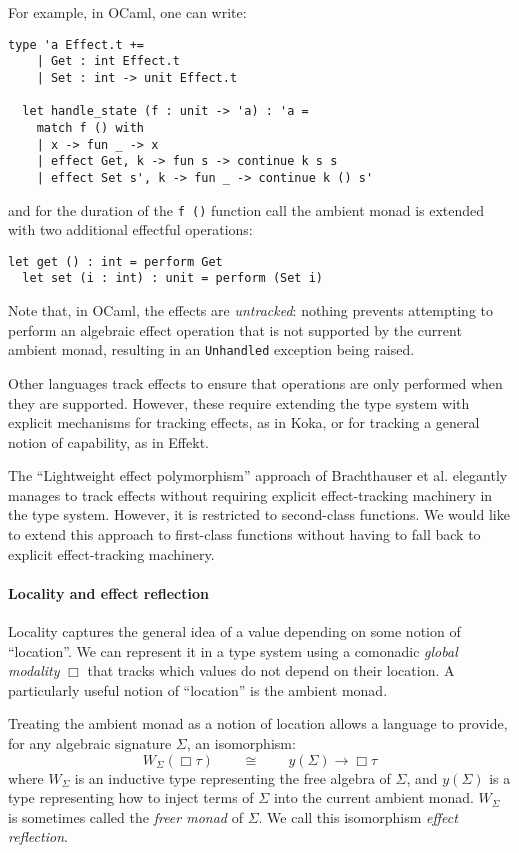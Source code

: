 \documentclass[acmsmall, screen, nonacm]{acmart}
\theoremstyle{definition}
\newcommand{\glob}{\mathop{\Box}}
\newcommand{\yoneda}[1]{y(#1)}
\newcommand{\ind}[1]{W_{#1}}
\begin{document}
For example, in OCaml, one can write:
\begin{lstlisting}[style=oxcaml]
  type 'a Effect.t +=
    | Get : int Effect.t
    | Set : int -> unit Effect.t

  let handle_state (f : unit -> 'a) : 'a =
    match f () with
    | x -> fun _ -> x
    | effect Get, k -> fun s -> continue k s s
    | effect Set s', k -> fun _ -> continue k () s'
\end{lstlisting}
and for the duration of the \lstinline[style=oxcaml]{f ()} function call
the ambient monad is extended with two additional effectful operations:
\begin{lstlisting}[style=oxcaml]
  let get () : int = perform Get
  let set (i : int) : unit = perform (Set i)
\end{lstlisting}

Note that, in OCaml, the effects are \emph{untracked}: nothing prevents
attempting to perform an algebraic effect operation that is not
supported by the current ambient monad, resulting in an
\lstinline[style=oxcaml]{Unhandled} exception being raised.

Other languages track effects to ensure that operations are only
performed when they are supported. However, these require extending the
type system with explicit mechanisms for tracking effects, as in
Koka\cite{leijen2017type}, or for tracking a general notion of
capability, as in Effekt\cite{brachthauser2022effects}.

The ``Lightweight effect polymorphism'' approach of Brachthauser et
al. elegantly manages to track effects without requiring explicit
effect-tracking machinery in the type system. However, it is restricted
to second-class functions. We would like to extend this approach to
first-class functions without having to fall back to explicit
effect-tracking machinery.

\paragraph{Locality and effect reflection}
Locality captures the general idea of a value depending on some notion
of ``location''. We can represent it in a type system using a comonadic
\emph{global modality} $\glob$ that tracks which values do not depend on
their location. A particularly useful notion of ``location'' is the
ambient monad.

Treating the ambient monad as a notion of location allows a language to
provide, for any algebraic signature $\Sigma$, an isomorphism:
\begin{equation*}
  \ind{\Sigma}(\glob \tau) \qquad \cong \qquad \yoneda{\Sigma} \rightarrow \glob \tau
\end{equation*}
where $\ind{\Sigma}$ is an inductive type representing the free
algebra of $\Sigma$, and $\yoneda{\Sigma}$ is a type representing how
to inject terms of $\Sigma$ into the current ambient
monad. $\ind{\Sigma}$ is sometimes called the \emph{freer monad} of
$\Sigma$. We call this isomorphism \emph{effect reflection}.
\end{document}
